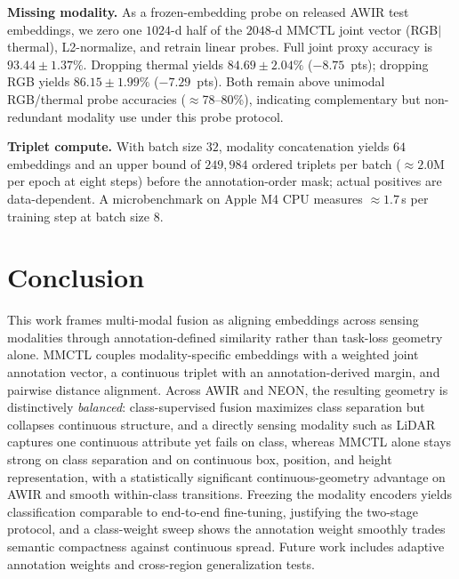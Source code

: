 \documentclass[10pt,twocolumn,letterpaper]{article}
\newcommand{\new}[1]{#1}
\begin{document}
\new{\noindent\textbf{Missing modality.} As a frozen-embedding probe on released AWIR test embeddings, we zero one $1024$-d half of the $2048$-d MMCTL joint vector (RGB$|$thermal), L2-normalize, and retrain linear probes. Full joint proxy accuracy is $93.44\pm1.37\%$. Dropping thermal yields $84.69\pm2.04\%$ ($-8.75$~pts); dropping RGB yields $86.15\pm1.99\%$ ($-7.29$~pts). Both remain above unimodal RGB/thermal probe accuracies ($\approx$78--80\%), indicating complementary but non-redundant modality use under this probe protocol.}

\new{\noindent\textbf{Triplet compute.} With batch size $32$, modality concatenation yields $64$ embeddings and an upper bound of $249{,}984$ ordered triplets per batch ($\approx 2.0$M per epoch at eight steps) before the annotation-order mask; actual positives are data-dependent. A microbenchmark on Apple M4 CPU measures $\approx 1.7$\,s per training step at batch size $8$.}


\section{Conclusion}
\new{This work frames multi-modal fusion as aligning embeddings across sensing modalities through annotation-defined similarity rather than task-loss geometry alone. MMCTL couples modality-specific embeddings with a weighted joint annotation vector, a continuous triplet with an annotation-derived margin, and pairwise distance alignment. Across AWIR and NEON, the resulting geometry is distinctively \emph{balanced}: class-supervised fusion maximizes class separation but collapses continuous structure, and a directly sensing modality such as LiDAR captures one continuous attribute yet fails on class, whereas MMCTL alone stays strong on class separation and on continuous box, position, and height representation, with a statistically significant continuous-geometry advantage on AWIR and smooth within-class transitions. Freezing the modality encoders yields classification comparable to end-to-end fine-tuning, justifying the two-stage protocol, and a class-weight sweep shows the annotation weight smoothly trades semantic compactness against continuous spread. Future work includes adaptive annotation weights and cross-region generalization tests.}
\end{document}
